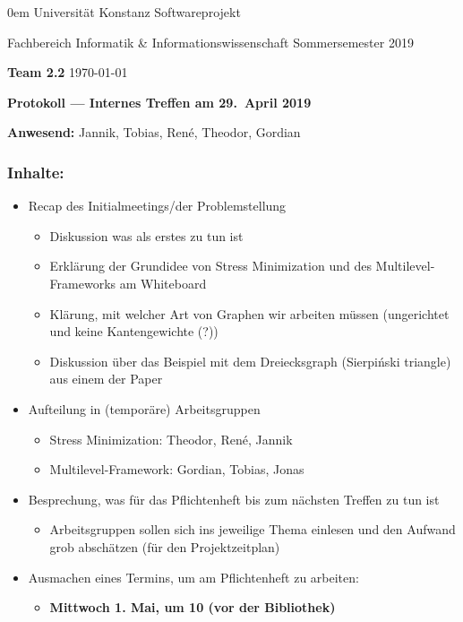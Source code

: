 \documentclass[11pt]{article} %
\newcommand{\names}{Team 2.2}
\begin{document}
\thispagestyle{plain}
{\footnotesize \parindent0em
    {\sc Universität Konstanz} \hfill {\sc Softwareprojekt}\par
    {\sc Fachbereich Informatik \& Informationswissenschaft} \hfill Sommersemester 2019 \par
    \textbf{\names} \hfill \today\par
    \begin{center}
      {\Large\bf Protokoll --- Internes Treffen am 29.\ April 2019}
    \end{center}}
  \par{\textbf{Anwesend:}} Jannik, Tobias, René, Theodor, Gordian
\subsubsection*{Inhalte:}
  \begin{itemize}
  \item Recap des Initialmeetings/der Problemstellung
    \begin{itemize}
    \item Diskussion was als erstes zu tun ist
    \item Erklärung der Grundidee von Stress Minimization und
      des Multilevel-Frameworks am Whiteboard
    \item Klärung, mit welcher Art von Graphen wir arbeiten müssen
      (ungerichtet und keine Kantengewichte (?))
    \item Diskussion über das Beispiel mit dem Dreiecksgraph (Sierpiński triangle) aus einem der Paper
    \end{itemize}
  \item Aufteilung in (temporäre) Arbeitsgruppen
    \begin{itemize}
    \item Stress Minimization: Theodor, René, Jannik
    \item Multilevel-Framework: Gordian, Tobias, Jonas
    \end{itemize}
  \item Besprechung, was für das Pflichtenheft bis zum nächsten Treffen zu tun ist
    \begin{itemize}
    \item Arbeitsgruppen sollen sich ins jeweilige Thema einlesen und den Aufwand grob abschätzen (für den Projektzeitplan)
    \end{itemize}
  \item Ausmachen eines Termins, um am Pflichtenheft zu arbeiten:
    \begin{itemize}
    \item {\large \bf Mittwoch 1. Mai, um 10 (vor der Bibliothek)}
    \end{itemize}
  \end{itemize}  
\end{document}
